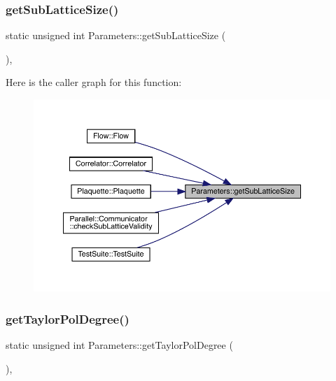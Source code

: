 \subsubsection{\texorpdfstring{getSubLatticeSize()}{getSubLatticeSize()}}
{\footnotesize\ttfamily static unsigned int Parameters\+::get\+Sub\+Lattice\+Size (\begin{DoxyParamCaption}{ }\end{DoxyParamCaption})\hspace{0.3cm}{\ttfamily [inline]}, {\ttfamily [static]}}

Here is the caller graph for this function\+:
\nopagebreak
\begin{figure}[H]
\begin{center}
\leavevmode
\includegraphics[width=350pt]{class_parameters_aff629ab94d99807364926008fb4e1e67_icgraph}
\end{center}
\end{figure}
\mbox{\label{class_parameters_a272f8ebfbd305fb4a3b03db68417fc90}} 
\subsubsection{\texorpdfstring{getTaylorPolDegree()}{getTaylorPolDegree()}}
{\footnotesize\ttfamily static unsigned int Parameters\+::get\+Taylor\+Pol\+Degree (\begin{DoxyParamCaption}{ }\end{DoxyParamCaption})\hspace{0.3cm}{\ttfamily [inline]}, {\ttfamily [static]}}


